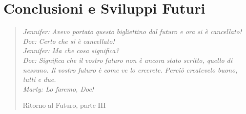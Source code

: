 \chapter{Conclusioni e Sviluppi Futuri}
\label{cap:sviluppi}
\thispagestyle{empty}

\begin{quotation}
{\footnotesize
\noindent\emph{Jennifer: Avevo portato questo bigliettino dal futuro e ora si è cancellato! \\
Doc: Certo che si è cancellato! \\
Jennifer: Ma che cosa significa? \\
Doc: Significa che il vostro futuro non è ancora stato scritto, quello di nessuno. Il vostro futuro è come ve lo creerete. Perciò createvelo buono, tutti e due. \\
Marty: Lo faremo, Doc!}
\begin{flushright}
Ritorno al Futuro, parte III
\end{flushright}
}
\end{quotation}
\vspace{0.5cm}
